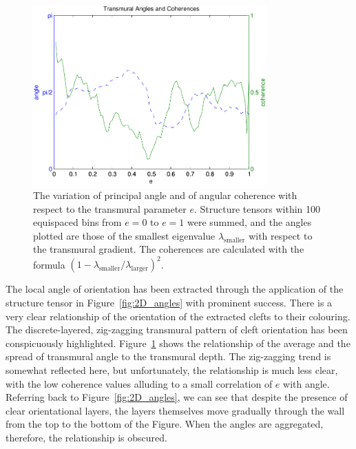     \begin{figure}[htbp]
      \centering
      \includegraphics[width=0.8\textwidth]{Ch7/Figs/angles_and_coherences_vs_e}
      \caption{The variation of principal angle and of angular coherence with respect to the transmural parameter $e$. Structure tensors within 100 equispaced bins from $e=0$ to $e=1$ were summed, and the angles plotted are those of the smallest eigenvalue $\lambda_{\text{smaller}}$ with respect to the transmural gradient. The coherences are calculated with the formula $(1 - \lambda_{\text{smaller}}/\lambda_{\text{larger}})^2$.}
      \label{fig:angles_and_coherences_vs_e}
    \end{figure}
    
    The local angle of orientation has been extracted through the application of the structure tensor in Figure~\ref{fig:2D_angles} with prominent success. There is a very clear relationship of the orientation of the extracted clefts to their colouring. The discrete-layered, zig-zagging transmural pattern of cleft orientation has been conspicuously highlighted. Figure~\ref{fig:angles_and_coherences_vs_e} shows the relationship of the average and the spread of transmural angle to the transmural depth. The zig-zagging trend is somewhat reflected here, but unfortunately, the relationship is much less clear, with the low coherence values alluding to a small correlation of $e$ with angle. Referring back to Figure~\ref{fig:2D_angles}, we can see that despite the presence of clear orientational layers, the layers themselves move gradually through the wall from the top to the bottom of the Figure. When the angles are aggregated, therefore, the relationship is obscured.
  
